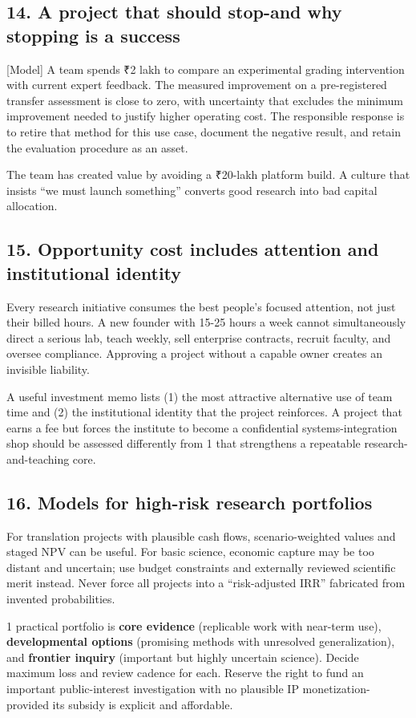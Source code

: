 \subsection{14. A project that should stop-and why stopping is a success}

[Model] A team spends ₹2 lakh to compare an experimental grading intervention with current expert feedback. The measured improvement on a pre-registered transfer assessment is close to zero, with uncertainty that excludes the minimum improvement needed to justify higher operating cost. The responsible response is to retire that method for this use case, document the negative result, and retain the evaluation procedure as an asset.

The team has created value by avoiding a ₹20-lakh platform build. A culture that insists ``we must launch something'' converts good research into bad capital allocation.

\subsection{15. Opportunity cost includes attention and institutional identity}

Every research initiative consumes the best people's focused attention, not just their billed hours. A new founder with 15-25 hours a week cannot simultaneously direct a serious lab, teach weekly, sell enterprise contracts, recruit faculty, and oversee compliance. Approving a project without a capable owner creates an invisible liability.

A useful investment memo lists (1) the most attractive alternative use of team time and (2) the institutional identity that the project reinforces. A project that earns a fee but forces the institute to become a confidential systems-integration shop should be assessed differently from 1 that strengthens a repeatable research-and-teaching core.

\subsection{16. Models for high-risk research portfolios}

For translation projects with plausible cash flows, scenario-weighted values and staged NPV can be useful. For basic science, economic capture may be too distant and uncertain; use budget constraints and externally reviewed scientific merit instead. Never force all projects into a ``risk-adjusted IRR'' fabricated from invented probabilities.

1 practical portfolio is \textbf{core evidence} (replicable work with near-term use), \textbf{developmental options} (promising methods with unresolved generalization), and \textbf{frontier inquiry} (important but highly uncertain science). Decide maximum loss and review cadence for each. Reserve the right to fund an important public-interest investigation with no plausible IP monetization-provided its subsidy is explicit and affordable.
